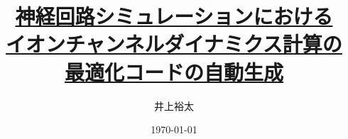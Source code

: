 \documentclass[a4j,10pt,onecolumn]{ujarticle} %
\title{\underline{神経回路シミュレーションにおける}\\\underline{イオンチャンネルダイナミクス計算の}\\\underline{最適化コードの自動生成}}
\date{\today}
\author{井上裕太}
\begin{document}
\maketitle %


\clearpage
\tableofcontents
\clearpage
\listoffigures
\clearpage
\listoftables

% 
\clearpage

\clearpage

\clearpage

\clearpage

\clearpage

\clearpage
\medskip


\clearpage

\end{document}
